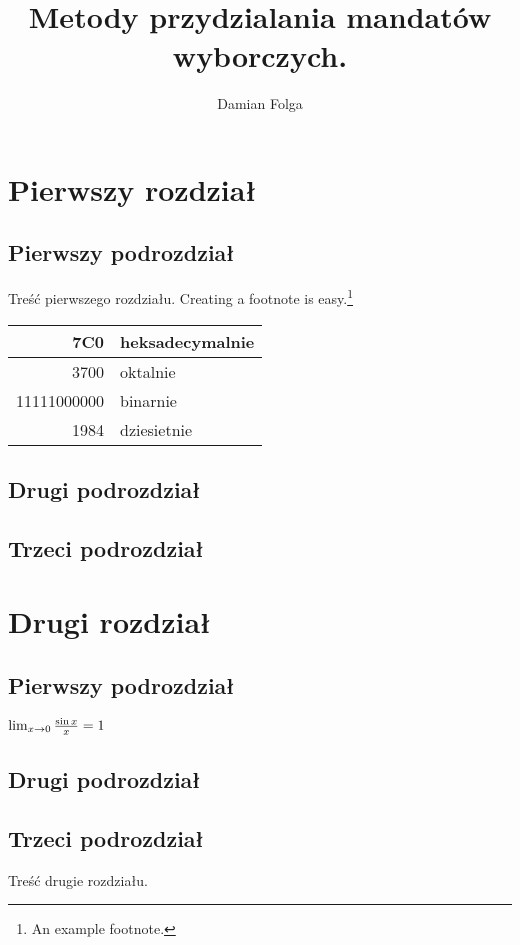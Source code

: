 \documentclass[12pt,a4paper,titlepage]{report}
\author{Damian Folga}
\title{Metody przydzialania mandatów wyborczych.}
\begin{document}
\maketitle
\tableofcontents
\newpage
\chapter{Pierwszy rozdział}
\section{Pierwszy podrozdział}
Treść pierwszego rozdziału.
Creating a footnote is easy.\footnote{An example footnote.}

\begin{tabular}{|r|l|} \hline
7C0 & heksadecymalnie \\
\hline \hline
3700 & oktalnie \\
\hline \hline
11111000000 & binarnie \\
\hline \hline
1984 & dziesietnie \\ \hline

\end{tabular}

\section{Drugi podrozdział}
\section{Trzeci podrozdział}
\newpage
\chapter{Drugi rozdział}
\section{Pierwszy podrozdział}
\begin{math}
 $$
\lim_{x \rightarrow 0} \frac{\sin x}{x}=1
$$
\end{math}

\section{Drugi podrozdział}
\section{Trzeci podrozdział}
\cite{pa}Treść drugie rozdziału.
\end{document}
